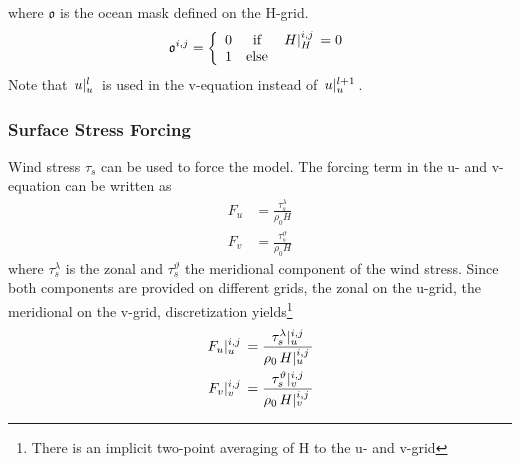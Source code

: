 \documentclass[a4paper]{article}
\begin{document}
where $\mathfrak{o}$ is the ocean mask defined on the H-grid.
\begin{equation}
  \mathfrak{o}^{i,j} = \left\{ \begin{array}{rcl} 0 & \mbox{if} & \,{H}\vert_{H}^{{i},{j}}\,=0 \\
				1 & \mbox{else} & \end{array} \right.
\end{equation}
Note that $\,{u}\vert_{u}^{{l}}\,$ is used in the v-equation instead of $\,{u}\vert_{u}^{{l+1}}\,$.

\subsubsection{Surface Stress Forcing}
Wind stress $\tau_s$ can be used to force the model. The forcing term in the u- and v-equation can be written as
\begin{align}
  F_u &= \frac{\tau_s^\lambda}{\rho_0H} \\
  F_v &= \frac{\tau_s^\vartheta}{\rho_0H}
\end{align}
where $\tau_s^\lambda$ is the zonal and $\tau_s^\vartheta$ the meridional component of the wind stress. Since both components are provided on different grids, the zonal on the u-grid, the meridional on the v-grid, discretization yields\footnote{There is an implicit two-point averaging of H to the u- and v-grid}
\begin{align}
  \,{F_u}\vert_{u}^{{i},{j}}\, &= \frac{\,{\tau_s^\lambda}\vert_{u}^{{i},{j}}\,}{\rho_0\,{H}\vert_{u}^{{i},{j}}\,} \\
  \,{F_v}\vert_{v}^{{i},{j}}\, &= \frac{\,{\tau_s^\vartheta}\vert_{v}^{{i},{j}}\,}{\rho_0\,{H}\vert_{v}^{{i},{j}}\,}
\end{align}
\end{document}
